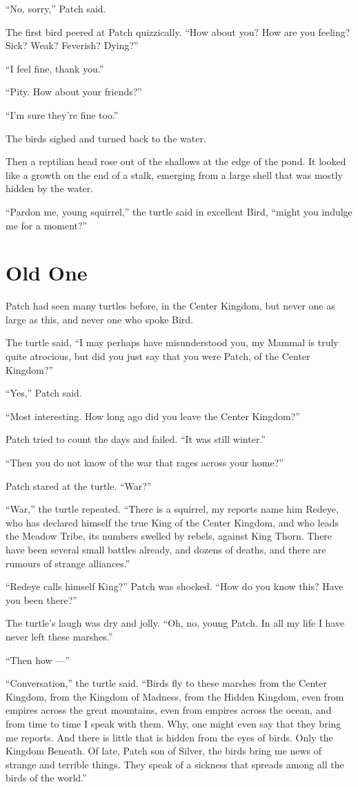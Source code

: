 \documentclass[ebook,oneside,openany,17pt]{memoir}
\renewcommand{\thechapter}{\Roman{chapter}}
\newcounter{sections}
\newcommand{\sections}[1]{%
  \section*{#1}
  \addtocounter{sections}{1}%
  \pdfbookmark[1]{#1}{section.\thechapter.\thesections}}
\begin{document}
“No, sorry,” Patch said.

The first bird peered at Patch quizzically. “How about you? How are
you feeling? Sick? Weak? Feverish? Dying?”

“I feel fine, thank you.”

“Pity. How about your friends?”

“I’m sure they’re fine too.”

The birds sighed and turned back to the water.

Then a reptilian head rose out of the shallows at the edge of the
pond. It looked like a growth on the end of a stalk, emerging from a
large shell that was mostly hidden by the water.

“Pardon me, young squirrel,” the turtle said in excellent Bird, “might
you indulge me for a moment?”


\sections{Old One}

Patch had seen many turtles before, in the Center Kingdom, but never
one as large as this, and never one who spoke Bird.

The turtle said, “I may perhaps have misunderstood you, my Mammal is
truly quite atrocious, but did you just say that you were Patch, of
the Center Kingdom?”

“Yes,” Patch said.

“Most interesting. How long ago did you leave the Center Kingdom?”

Patch tried to count the days and failed. “It was still winter.”

“Then you do not know of the war that rages across your home?”

Patch stared at the turtle. “War?”

“War,” the turtle repeated. “There is a squirrel, my reports name him
Redeye, who has declared himself the true King of the Center Kingdom,
and who leads the Meadow Tribe, its numbers swelled by rebels, against
King Thorn. There have been several small battles already, and dozens
of deaths, and there are rumours of strange alliances.”

“Redeye calls himself King?” Patch was shocked. “How do you know this?
Have you been there?”

The turtle’s laugh was dry and jolly. “Oh, no, young Patch. In all my
life I have never left these marshes.”

“Then how —”

“Conversation,” the turtle said. “Birds fly to these marshes from the
Center Kingdom, from the Kingdom of Madness, from the Hidden Kingdom,
even from empires across the great mountains, even from empires across
the ocean, and from time to time I speak with them. Why, one might
even say that they bring me reports. And there is little that is
hidden from the eyes of birds. Only the Kingdom Beneath. Of late,
Patch son of Silver, the birds bring me news of strange and terrible
things. They speak of a sickness that spreads among all the birds of
the world.”
\end{document}
